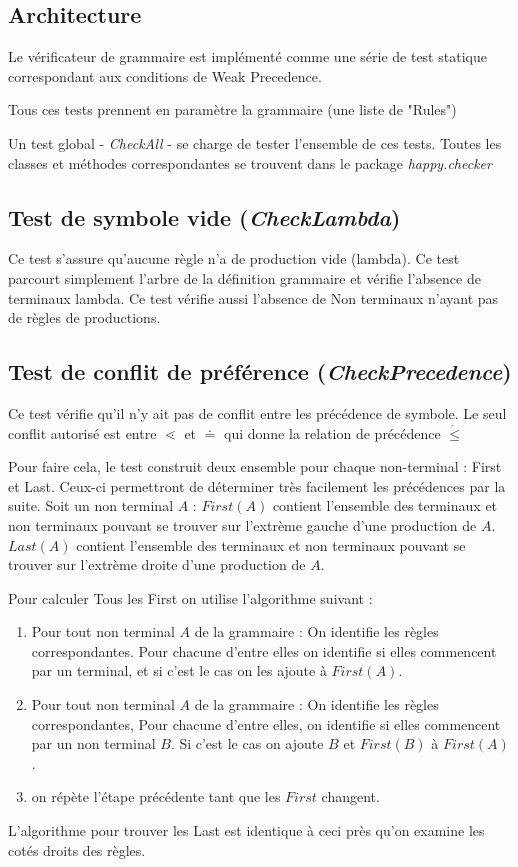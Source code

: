 	\subsection{Architecture}
	Le vérificateur de grammaire est implémenté comme une série de test
	statique correspondant aux conditions de Weak Precedence.
	
	Tous ces tests prennent en paramètre la grammaire (une liste de "Rules")

	Un test global - \emph{CheckAll} - se charge de tester l'ensemble de ces tests.
	Toutes les classes et méthodes correspondantes se trouvent dans le package \emph{happy.checker}

	\subsection{Test de symbole vide (\emph{CheckLambda})}
		Ce test s'assure qu'aucune règle n'a de production vide (lambda).
		Ce test parcourt simplement l'arbre de la définition grammaire et
		vérifie l'absence de terminaux lambda. Ce test vérifie aussi l'absence
		de Non terminaux n'ayant pas de règles de productions. 

	\subsection{Test de conflit de préférence (\emph{CheckPrecedence})}
		Ce test vérifie qu'il n'y ait pas de conflit entre les précédence
		de symbole. Le seul conflit autorisé est entre $\lessdot$ et $\doteq$ qui donne
		la relation de précédence $\dot{\leq}$

		Pour faire cela, le test construit deux ensemble pour chaque non-terminal :
		First et Last. Ceux-ci permettront de déterminer très facilement les précédences
		par la suite. Soit un non terminal $A$ : $First(A)$ contient l'ensemble des terminaux et non terminaux 
		pouvant se trouver sur l'extrème gauche d'une production de $A$. $Last(A)$ contient l'ensemble
		des terminaux et non terminaux pouvant se trouver sur l'extrème droite d'une production de $A$. 

		Pour calculer Tous les First on utilise l'algorithme suivant :
		\begin{enumerate}
			\item Pour tout non terminal $A$ de la grammaire : On identifie les règles correspondantes.
			Pour chacune d'entre elles on identifie si elles commencent par un terminal, et si
			c'est le cas on les ajoute à $First(A)$. 
			\item Pour tout non terminal $A$ de la grammaire : On identifie les règles correspondantes,
			Pour chacune d'entre elles, on identifie si elles commencent par un non terminal $B$.
			Si c'est le cas on ajoute $B$ et $First(B)$ à $First(A)$. 
			\item on répète l'étape précédente tant que les $First$ changent.
		\end{enumerate}
		L'algorithme pour trouver les Last est identique à ceci près qu'on examine les cotés droits des règles.
		
